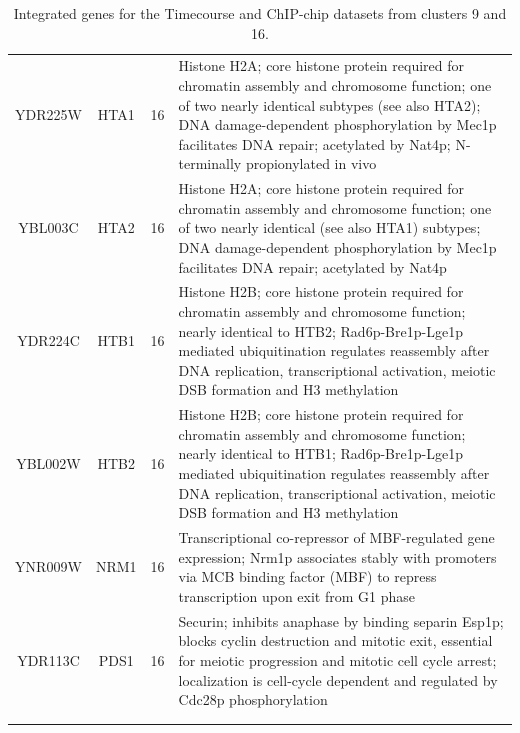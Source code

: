 \documentclass[]{article}
\begin{document}
\begin{longtable}{@{\extracolsep{3pt}} cccp{85mm}}
YDR225W & HTA1 & 16 & Histone H2A; core histone protein required for chromatin assembly and chromosome function; one of two nearly identical subtypes (see also HTA2); DNA damage-dependent phosphorylation by Mec1p facilitates DNA repair; acetylated by Nat4p; N-terminally propionylated in vivo \\ 
YBL003C & HTA2 & 16 & Histone H2A; core histone protein required for chromatin assembly and chromosome function; one of two nearly identical (see also HTA1) subtypes; DNA damage-dependent phosphorylation by Mec1p facilitates DNA repair; acetylated by Nat4p \\ 
YDR224C & HTB1 & 16 & Histone H2B; core histone protein required for chromatin assembly and chromosome function; nearly identical to HTB2; Rad6p-Bre1p-Lge1p mediated ubiquitination regulates reassembly after DNA replication, transcriptional activation, meiotic DSB formation and H3 methylation \\ 
YBL002W & HTB2 & 16 & Histone H2B; core histone protein required for chromatin assembly and chromosome function; nearly identical to HTB1; Rad6p-Bre1p-Lge1p mediated ubiquitination regulates reassembly after DNA replication, transcriptional activation, meiotic DSB formation and H3 methylation \\ 
YNR009W & NRM1 & 16 & Transcriptional co-repressor of MBF-regulated gene expression; Nrm1p associates stably with promoters via MCB binding factor (MBF) to repress transcription upon exit from G1 phase \\ 
YDR113C & PDS1 & 16 & Securin; inhibits anaphase by binding separin Esp1p; blocks cyclin destruction and mitotic exit, essential for meiotic progression and mitotic cell cycle arrest; localization is cell-cycle dependent and regulated by Cdc28p phosphorylation \\   \hline \\ [-1.8ex] 
\caption{Integrated genes for the Timecourse and ChIP-chip datasets from clusters 9 and 16.}
\label{tab:timecoursChIPchipFusedCl916}
\end{longtable} 
\end{document}

